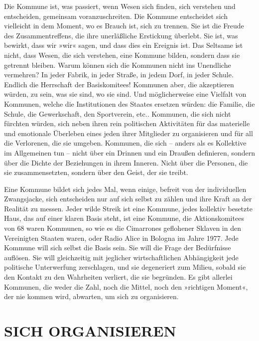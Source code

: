 Die Kommune ist, was passiert, wenn Wesen sich finden, sich
verstehen und entscheiden, gemeinsam voranzuschreiten. Die Kommune
entscheidet sich vielleicht in dem Moment, wo es Brauch ist, sich
zu trennen. Sie ist die Freude des Zusammentreffens, die ihre
unerläßliche Erstickung überlebt. Sie ist, was bewirkt, dass wir
»wir« sagen, und dass dies ein Ereignis ist. Das Seltsame ist
nicht, dass Wesen, die sich verstehen, eine Kommune bilden, sondern
dass sie getrennt bleiben. Warum können sich die Kommunen nicht ins
Unendliche vermehren? In jeder Fabrik, in jeder Straße, in jedem
Dorf, in jeder Schule. Endlich die Herrschaft der Basiskomitees!
Kommunen aber, die akzeptieren würden, zu sein, was sie sind, wo
sie sind. Und möglicherweise eine Vielfalt von Kommunen, welche die
Institutionen des Staates ersetzen würden: die Familie, die Schule,
die Gewerkschaft, den Sportverein, etc.. Kommunen, die sich nicht
fürchten würden, sich neben ihren rein politischen Aktivitäten für
das materielle und emotionale Überleben eines jeden ihrer
Mitglieder zu organisieren und für all die Verlorenen, die sie
umgeben. Kommunen, die sich – anders als es Kollektive im
Allgemeinen tun – nicht über ein Drinnen und ein Draußen
definieren, sondern über die Dichte der Beziehungen in ihrem
Inneren. Nicht über die Personen, die sie zusammensetzten, sondern
über den Geist, der sie treibt.
\extrapar{}

Eine Kommune bildet sich jedes Mal, wenn einige, befreit von der
individuellen Zwangsjacke, sich entscheiden nur auf sich selbst zu
zählen und ihre Kraft an der Realität zu messen. Jeder wilde Streik
ist eine Kommune, jedes kollektiv besetzte Haus, das auf einer
klaren Basis steht, ist eine Kommune, die Aktionskomitees von 68
waren Kommunen, so wie es die Cimarrones geflohener Sklaven in den
Vereinigten Staaten waren, oder Radio Alice in Bologna im Jahre
1977. Jede Kommune will sich selbst die Basis sein. Sie will die
Frage der Bedürfnisse auflösen. Sie will gleichzeitig mit jeglicher
wirtschaftlichen Abhängigkeit jede politische Unterwerfung
zerschlagen, und sie degeneriert zum Milieu, sobald sie den Kontakt
zu den Wahrheiten verliert, die sie begründen. Es gibt allerlei
Kommunen, die weder die Zahl, noch die Mittel, noch den »richtigen
Moment«, der nie kommen wird, abwarten, um sich zu organisieren.

\section{SICH ORGANISIEREN}


